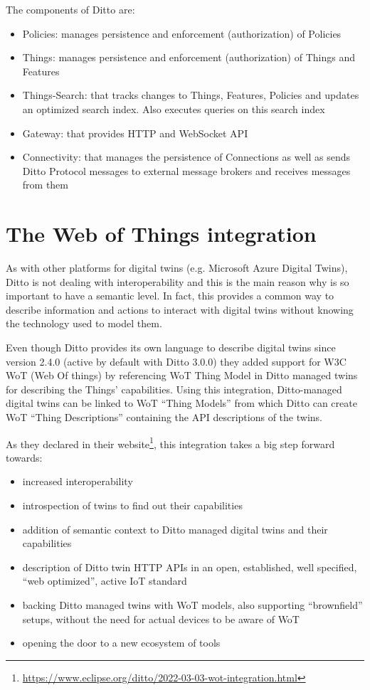 The components of Ditto are:
\begin{itemize}
  \item Policies: manages persistence and enforcement (authorization) of Policies
  \item Things: manages persistence and enforcement (authorization) of Things and Features
  \item Things-Search: that tracks changes to Things, Features, Policies and updates an optimized search index. Also executes queries on this search index
  \item Gateway: that provides HTTP and WebSocket API
  \item Connectivity: that manages the persistence of Connections as well as sends Ditto Protocol messages to external message brokers and receives messages from them
\end{itemize}






\section{The Web of Things integration}
As with other platforms for digital twins (e.g. Microsoft Azure Digital Twins), Ditto is not dealing with interoperability and this is the main reason why is so important to have a semantic level.
In fact, this provides a common way to describe information and actions to interact with digital twins without knowing the technology used to model them.

Even though Ditto provides its own language to describe digital twins since version 2.4.0 (active by default with Ditto 3.0.0) they added support for W3C WoT (Web Of things) by referencing WoT Thing Model in Ditto managed twins for describing the Things' capabilities.
Using this integration, Ditto-managed digital twins can be linked to WoT ``Thing Models'' from which Ditto can create WoT ``Thing Descriptions'' containing the API descriptions of the twins.

As they declared in their website\footnote{\url{https://www.eclipse.org/ditto/2022-03-03-wot-integration.html}}, this integration takes a big step forward towards:
\begin{itemize}
    \item increased interoperability
    \item introspection of twins to find out their capabilities
    \item addition of semantic context to Ditto managed digital twins and their capabilities
    \item description of Ditto twin HTTP APIs in an open, established, well specified, ``web optimized'', active IoT standard
    \item backing Ditto managed twins with WoT models, also supporting ``brownfield'' setups, without the need for actual devices to be aware of WoT
    \item opening the door to a new ecosystem of tools
\end{itemize}

